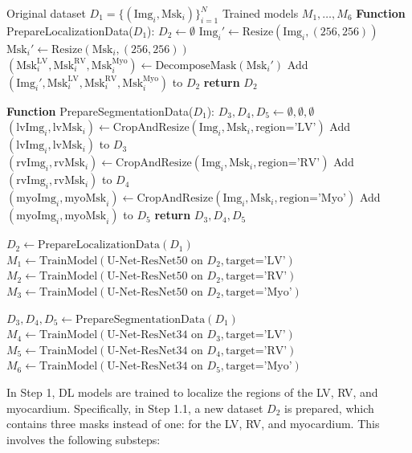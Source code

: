 \documentclass[fleqn,10pt]{wlscirep}
\begin{document}
\begin{algorithm}[ht]
\caption{Training Procedure for Segmentation Models}\label{alg:training}
\begin{algorithmic}[1]
\Require Original dataset $D_1 = \{(\text{Img}_i, \text{Msk}_i)\}_{i=1}^N$
\Ensure Trained models $M_1, \dots, M_6$
\State \textbf{Function} PrepareLocalizationData($D_1$):
\State $D_2 \gets \emptyset$
    \State $\text{Img}_i' \gets \text{Resize}(\text{Img}_i, (256, 256))$
    \State $\text{Msk}_i' \gets \text{Resize}(\text{Msk}_i, (256, 256))$
    \State $(\text{Msk}_i^{\text{LV}}, \text{Msk}_i^{\text{RV}}, \text{Msk}_i^{\text{Myo}}) \gets \text{DecomposeMask}(\text{Msk}_i')$
    \State Add $(\text{Img}_i', \text{Msk}_i^{\text{LV}}, \text{Msk}_i^{\text{RV}}, \text{Msk}_i^{\text{Myo}})$ to $D_2$
\EndFor
\State \textbf{return} $D_2$

\State \textbf{Function} PrepareSegmentationData($D_1$):
\State $D_3, D_4, D_5 \gets \emptyset, \emptyset, \emptyset$
    \State $(\text{lvImg}_i, \text{lvMsk}_i) \gets \text{CropAndResize}(\text{Img}_i, \text{Msk}_i, \text{region='LV'})$
    \State Add $(\text{lvImg}_i, \text{lvMsk}_i)$ to $D_3$
    \State $(\text{rvImg}_i, \text{rvMsk}_i) \gets \text{CropAndResize}(\text{Img}_i, \text{Msk}_i, \text{region='RV'})$
    \State Add $(\text{rvImg}_i, \text{rvMsk}_i)$ to $D_4$
    \State $(\text{myoImg}_i, \text{myoMsk}_i) \gets \text{CropAndResize}(\text{Img}_i, \text{Msk}_i, \text{region='Myo'})$
    \State Add $(\text{myoImg}_i, \text{myoMsk}_i)$ to $D_5$
\EndFor
\State \textbf{return} $D_3, D_4, D_5$

\State $D_2 \gets \text{PrepareLocalizationData}(D_1)$
\State $M_1 \gets \text{TrainModel}(\text{U-Net-ResNet50 on } D_2, \text{target='LV'})$
\State $M_2 \gets \text{TrainModel}(\text{U-Net-ResNet50 on } D_2, \text{target='RV'})$
\State $M_3 \gets \text{TrainModel}(\text{U-Net-ResNet50 on } D_2, \text{target='Myo'})$

\State $D_3, D_4, D_5 \gets \text{PrepareSegmentationData}(D_1)$
\State $M_4 \gets \text{TrainModel}(\text{U-Net-ResNet34 on } D_3, \text{target='LV'})$
\State $M_5 \gets \text{TrainModel}(\text{U-Net-ResNet34 on } D_4, \text{target='RV'})$
\State $M_6 \gets \text{TrainModel}(\text{U-Net-ResNet34 on } D_5, \text{target='Myo'})$
\end{algorithmic}
\end{algorithm}

In Step 1, DL models are trained to localize the regions of the LV, RV, and myocardium. Specifically, in Step 1.1, a new dataset \({D_2}\) is prepared, which contains three masks instead of one: for the LV, RV, and myocardium. This involves the following substeps:
\end{document}

